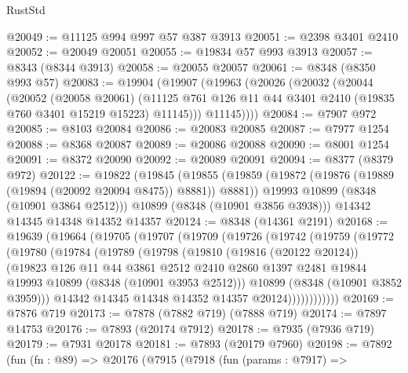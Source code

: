 \begin{lexlean}{RustStd}
\begin{coremodule}
@20049 := @11125 @994 @997 @57 @387 @3913
@20051 := @2398 @3401 @2410
@20052 := @20049 @20051
@20055 := @19834 @57 @993 @3913
@20057 := @8343 (@8344 @3913)
@20058 := @20055 @20057
@20061 := @8348 (@8350 @993 @57)
@20083 := @19904
    (@19907
      (@19963
        (@20026
          (@20032
            (@20044
              (@20052
                (@20058 @20061)
                (@11125 @761 @126 @11 @44 @3401 @2410 (@19835 @760 @3401 @15219 @15223) @11145)))
            @11145))))
@20084 := @7907 @972
@20085 := @8103 @20084
@20086 := @20083 @20085
@20087 := @7977 @1254
@20088 := @8368 @20087
@20089 := @20086 @20088
@20090 := @8001 @1254
@20091 := @8372 @20090
@20092 := @20089 @20091
@20094 := @8377 (@8379 @972)
@20122 := @19822
    (@19845
      (@19855
        (@19859 (@19872 (@19876 (@19889 (@19894 (@20092 @20094 @8475)) @8881)) @8881))
        @19993
        @10899
        (@8348 (@10901 @3864 @2512)))
      @10899
      (@8348 (@10901 @3856 @3938)))
    @14342
    @14345
    @14348
    @14352
    @14357
@20124 := @8348 (@14361 @2191)
@20168 := @19639
    (@19664
      (@19705
        (@19707
          (@19709
            (@19726
              (@19742
                (@19759
                  (@19772
                    (@19780
                      (@19784
                        (@19789
                          (@19798
                            (@19810
                              (@19816 (@20122 @20124))
                              (@19823
                                @126
                                @11
                                @44
                                @3861
                                @2512
                                @2410
                                @2860
                                @1397
                                @2481
                                @19844
                                @19993
                                @10899
                                (@8348 (@10901 @3953 @2512)))
                              @10899
                              (@8348 (@10901 @3852 @3959)))
                            @14342
                            @14345
                            @14348
                            @14352
                            @14357
                            @20124))))))))))))
@20169 := @7876 @719
@20173 := @7878 (@7882 @719) (@7888 @719)
@20174 := @7897 @14753
@20176 := @7893 (@20174 @7912)
@20178 := @7935 (@7936 @719)
@20179 := @7931 @20178
@20181 := @7893 (@20179 @7960)
@20198 := @7892
    (fun (fn : @89) =>
    @20176
      (@7915
        (@7918
          (fun (params : @7917) =>

\end{coremodule}
\end{lexlean}
